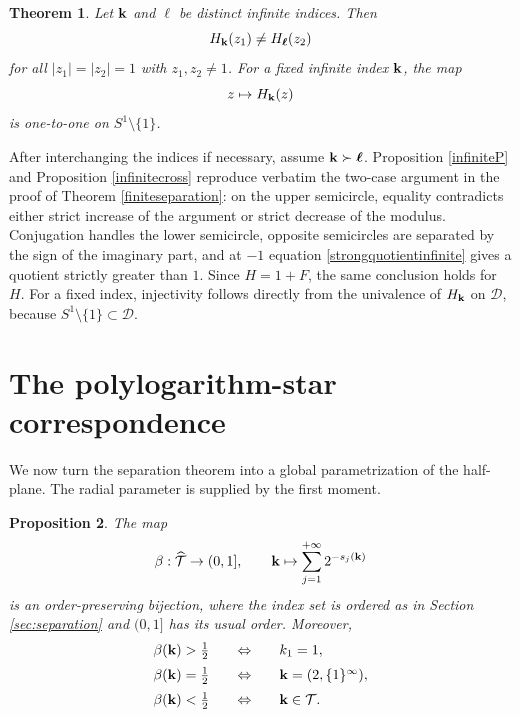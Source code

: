 \documentclass[12pt,a4paper]{amsart}
\makeatletter
\numberwithin{equation}{section}
\renewenvironment{proof}[1][Proof]{%
  \par\pushQED{\qed}%
  \normalfont\topsep6\p@\@plus6\p@\relax
  \trivlist
  \item[\hskip\labelsep\bfseries #1:]\ignorespaces
}{%
  \popQED\endtrivlist\@endpefalse
}
\theoremstyle{plain}
\newtheorem{Thm}{Theorem}[section]
\newtheorem{prop}[Thm]{Proposition}
\theoremstyle{definition}
\makeatother
\begin{document}
\begin{Thm}\label{infiniteseparation}
Let ${\bf k}$ and ${\boldsymbol\ell}$ be distinct infinite indices.  Then
\[
H_{\bf k}(z_1)\neq H_{\boldsymbol\ell}(z_2)
\]
for all $|z_1|=|z_2|=1$ with $z_1,z_2\neq 1$.
For a fixed infinite index ${\bf k}$, the map
\[
z\mapsto H_{\bf k}(z)
\]
is one-to-one on $S^1\setminus\{1\}$.
\end{Thm}

\begin{proof}
After interchanging the indices if necessary, assume
${\bf k}\succ{\boldsymbol\ell}$.  Proposition \ref{infiniteP} and Proposition \ref{infinitecross} reproduce verbatim the two-case argument in the proof of Theorem \ref{finiteseparation}: on the upper semicircle, equality contradicts either strict increase of the argument or strict decrease of the modulus.  Conjugation handles the lower semicircle, opposite semicircles are separated by the sign of the imaginary part, and at $-1$ equation \eqref{strongquotientinfinite} gives a quotient strictly greater than $1$.  Since $H=1+F$, the same conclusion holds for $H$. For a fixed index, injectivity follows directly from the univalence of $H_{\bf k}$ on $\mathcal{D}$, because $S^1\setminus\{1\}\subset\mathcal{D}$.
\end{proof}

\section{The polylogarithm-star correspondence}\label{sec:correspondence}
We now turn the separation theorem into a global parametrization of the half-plane.  The radial parameter is supplied by the first moment.

\begin{prop}\label{binarycoordinate}
The map
\[
\beta:\widehat{\mathcal{T}}\rightarrow(0,1],
\qquad
{\bf k}\mapsto\sum_{j=1}^{+\infty}2^{-s_j({\bf k})}
\]
is an order-preserving bijection, where the index set is ordered as in Section \ref{sec:separation} and $(0,1]$ has its usual order.
Moreover,
\[
\begin{array}{lll}
\beta({\bf k})>\frac12\quad&\Leftrightarrow\quad &k_1=1,\\[2mm]
\beta({\bf k})=\frac12&\Leftrightarrow&{\bf k}=(2,\{1\}^\infty),\\[2mm]
\beta({\bf k})<\frac12&\Leftrightarrow&{\bf k}\in\mathcal{T}.
\end{array}
\]
\end{prop}
\end{document}
